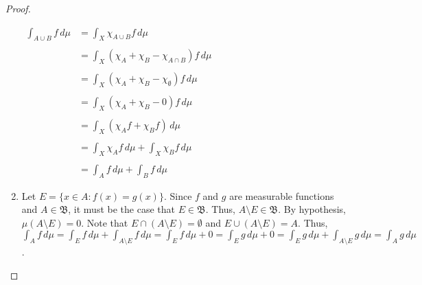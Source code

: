 \documentclass[12pt]{article}
\begin{document}
\begin{proof}
\begin{enumerate}
\begin{center}
$\begin{array}{ll}
\displaystyle \int_{A \cup B} f \, d\mu & \displaystyle =\int_X \chi_{A \cup B}f \, d\mu \\
\\
& \displaystyle =\int_X \left( \chi_A+\chi_B-\chi_{A \cap B} \right)f \, d\mu \\
\\
& \displaystyle =\int_X \left( \chi_A+\chi_B-\chi_{\emptyset} \right)f \, d\mu \\
\\
& \displaystyle =\int_X \left( \chi_A+\chi_B-0 \right)f \, d\mu \\
\\
& \displaystyle =\int_X \left( \chi_Af+\chi_Bf \right) \, d\mu \\
\\
& \displaystyle =\int_X \chi_Af \, d\mu +\int_X \chi_Bf \, d\mu \\
\\
& \displaystyle =\int_A f \, d\mu +\int_B f \, d\mu \end{array}$
\end{center}

\item Let $E=\{x \in A:f(x)=g(x)\}$.  Since $f$ and $g$ are measurable functions and $A \in \mathfrak{B}$, it must be the case that $E \in \mathfrak{B}$.  Thus, $A \setminus E \in \mathfrak{B}$.  By hypothesis, $\mu(A \setminus E)=0$.  Note that $E \cap (A \setminus E)=\emptyset$ and $E \cup (A \setminus E)=A$.  Thus, $\displaystyle \int_A f \, d\mu =\int_E f \, d\mu +\int_{A \setminus E} f \, d\mu =\int_E f \, d\mu +0=\int_E g \, d\mu +0=\int_E g \, d\mu +\int_{A \setminus E} g \, d\mu =\int_A g \, d\mu$.

\end{enumerate}
\end{proof}
\end{document}
